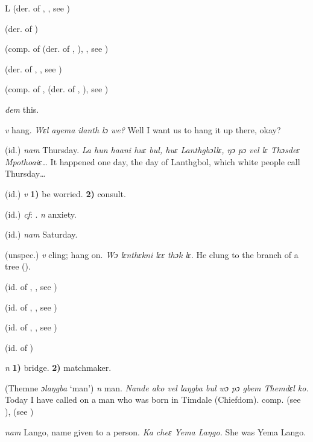 \begin{letter}{L}
 (der. of , , see )

 (der. of ) 

 (comp. of  (der. of , ), , see ) 

 (der. of , , see ) 

 (comp. of ,  (der. of , ), see ) 

 \textit{dem} this.

 \textit{v} hang. \textit{Wɛl ayema ilanth lɔ we?} Well I want us to hang it up there, okay?

 (id.) \textit{nam} Thursday. \textit{La hun haani huɛ bul, huɛ Lanthgbɔllɛ, ŋɔ pɔ vel lɛ Thɔsdeɛ Mpothoaiɛ…} It happened one day, the day of Lanthgbol, which white people call Thursday…

 (id.) \textit{v} \textbf{1)} be worried. \textbf{2)} consult.

 (id.) \textit{cf}: . \textit{n} anxiety.

 (id.) \textit{nam} Saturday. 

 (unspec.) \textit{v} cling; hang on. \textit{Wɔ lɛnthɛkni lɛɛ thɔk lɛ.} He clung to the branch of a tree (\citealt{Pichl1967}). 

 (id. of , , see ) 

 (id. of , , see ) 

 (id. of , , see ) 

 (id. of ) 

 \textit{n} \textbf{1)} bridge. \textbf{2)} matchmaker.

 (Themne \textit{ɔlaŋgba} ‘man') \textit{n} man. \textit{Nande ako vel laŋgba bul wɔ pɔ gbem Themdɛl ko.} Today I have called on a man who was born in Timdale (Chiefdom). comp.  (see ),  (see ) 

 \textit{nam} Lango, name given to a person. \textit{Ka cheɛ Yema Laŋgo.} She was Yema Lango.


\end{letter}
